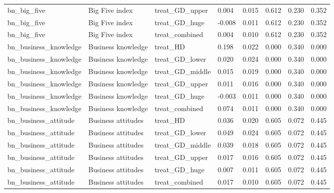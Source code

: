\begin{tabular}{llllllll}
bn\_big\_five & Big Five index & treat\_GD\_upper & 0.004 & 0.015 & 0.612 & 0.230 & 0.352 \\
bn\_big\_five & Big Five index & treat\_GD\_huge & -0.008 & 0.011 & 0.612 & 0.230 & 0.352 \\
bn\_big\_five & Big Five index & treat\_combined & 0.004 & 0.010 & 0.612 & 0.230 & 0.352 \\
bn\_business\_knowledge & Business knowledge & treat\_HD & 0.198 & 0.022 & 0.000 & 0.340 & 0.000 \\
bn\_business\_knowledge & Business knowledge & treat\_GD\_lower & 0.020 & 0.024 & 0.000 & 0.340 & 0.000 \\
bn\_business\_knowledge & Business knowledge & treat\_GD\_middle & 0.015 & 0.019 & 0.000 & 0.340 & 0.000 \\
bn\_business\_knowledge & Business knowledge & treat\_GD\_upper & 0.011 & 0.016 & 0.000 & 0.340 & 0.000 \\
bn\_business\_knowledge & Business knowledge & treat\_GD\_huge & -0.003 & 0.011 & 0.000 & 0.340 & 0.000 \\
bn\_business\_knowledge & Business knowledge & treat\_combined & 0.074 & 0.011 & 0.000 & 0.340 & 0.000 \\
bn\_business\_attitude & Business attitudes & treat\_HD & 0.036 & 0.020 & 0.605 & 0.072 & 0.445 \\
bn\_business\_attitude & Business attitudes & treat\_GD\_lower & 0.049 & 0.024 & 0.605 & 0.072 & 0.445 \\
bn\_business\_attitude & Business attitudes & treat\_GD\_middle & 0.039 & 0.018 & 0.605 & 0.072 & 0.445 \\
bn\_business\_attitude & Business attitudes & treat\_GD\_upper & 0.017 & 0.016 & 0.605 & 0.072 & 0.445 \\
bn\_business\_attitude & Business attitudes & treat\_GD\_huge & 0.007 & 0.011 & 0.605 & 0.072 & 0.445 \\
bn\_business\_attitude & Business attitudes & treat\_combined & 0.017 & 0.010 & 0.605 & 0.072 & 0.445 \\
\bottomrule
\end{tabular}
